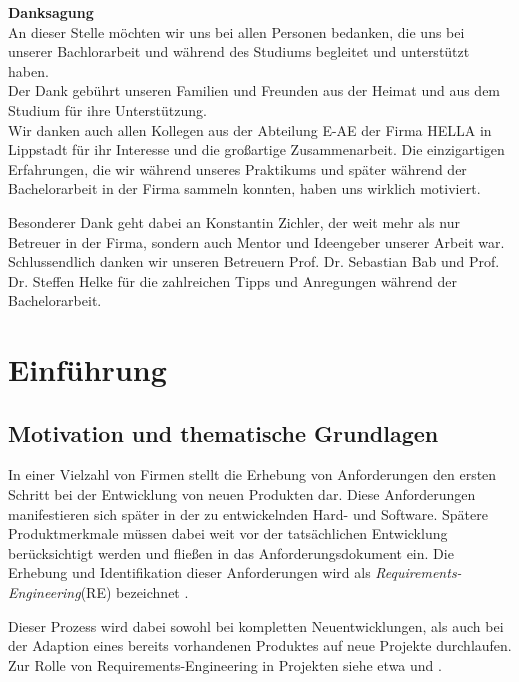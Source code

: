 \documentclass[12pt]{report}
\begin{document}
\thispagestyle{empty}
\textbf{Danksagung}
\vspace{12pt} \\
An dieser Stelle möchten wir uns bei allen Personen bedanken, die uns bei unserer Bachlorarbeit und während des Studiums begleitet und unterstützt haben.
\vspace{12pt} \\
Der Dank gebührt unseren Familien und Freunden aus der Heimat und aus dem Studium für ihre Unterstützung.
\vspace{12pt} \\
Wir danken auch allen Kollegen aus der Abteilung E-AE der Firma HELLA in Lippstadt für ihr Interesse und die großartige Zusammenarbeit. Die einzigartigen Erfahrungen, die wir während unseres Praktikums und später während der Bachelorarbeit in der Firma sammeln konnten, haben uns wirklich motiviert. 

Besonderer Dank geht dabei an Konstantin Zichler, der weit mehr als nur Betreuer in der Firma, sondern auch Mentor und Ideengeber unserer Arbeit war.
\vspace{12pt} \\
Schlussendlich danken wir unseren Betreuern Prof. Dr. Sebastian Bab und Prof. Dr. Steffen Helke für die zahlreichen Tipps und Anregungen während der Bachelorarbeit.
\newpage

\newpage
\chapter{Einführung}
\section[Motivation]{Motivation und thematische Grundlagen}
In einer Vielzahl von Firmen stellt die Erhebung von Anforderungen den ersten Schritt bei der Entwicklung von neuen Produkten dar. Diese Anforderungen manifestieren sich später in der zu entwickelnden Hard- und Software. Spätere Produktmerkmale müssen dabei weit vor der tatsächlichen Entwicklung berücksichtigt werden und fließen in das Anforderungsdokument ein. Die Erhebung und Identifikation dieser Anforderungen wird als \textit{Requirements-Engineering}(RE) bezeichnet \cite{bal10}.

Dieser Prozess wird dabei sowohl bei kompletten Neuentwicklungen, als auch bei der Adaption eines bereits vorhandenen Produktes auf neue Projekte durchlaufen. Zur Rolle von Requirements-Engineering in Projekten siehe etwa \cite{mw02} und \cite{hl01}. 
\end{document}
